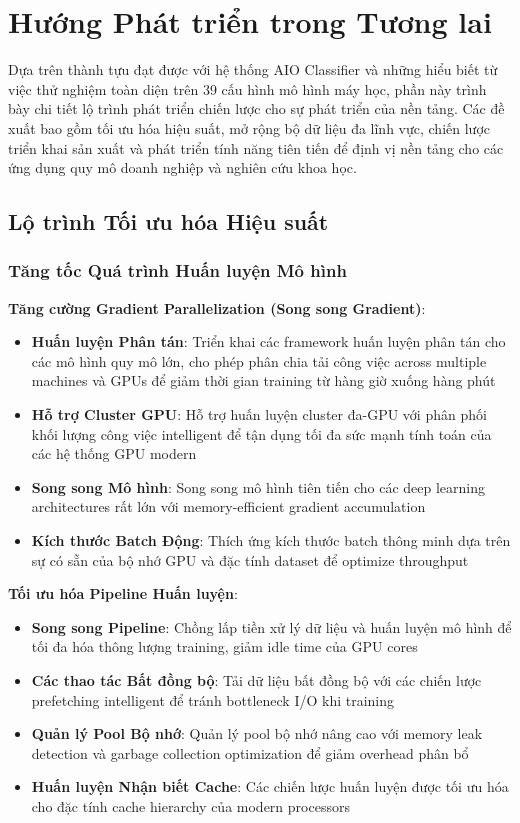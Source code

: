 \section{Hướng Phát triển trong Tương lai}\label{sec:future-development}

\noindent
Dựa trên thành tựu đạt được với hệ thống AIO Classifier và những hiểu biết từ việc thử nghiệm toàn diện trên 39 cấu hình mô hình máy học, phần này trình bày chi tiết lộ trình phát triển chiến lược cho sự phát triển của nền tảng. Các đề xuất bao gồm tối ưu hóa hiệu suất, mở rộng bộ dữ liệu đa lĩnh vực, chiến lược triển khai sản xuất và phát triển tính năng tiên tiến để định vị nền tảng cho các ứng dụng quy mô doanh nghiệp và nghiên cứu khoa học.

\subsection{Lộ trình Tối ưu hóa Hiệu suất}\label{subsec:performance-roadmap}

\subsubsection{Tăng tốc Quá trình Huấn luyện Mô hình}

\textbf{Tăng cường Gradient Parallelization (Song song Gradient)}:
\begin{itemize}
    \item \textbf{Huấn luyện Phân tán}: Triển khai các framework huấn luyện phân tán cho các mô hình quy mô lớn, cho phép phân chia tải công việc across multiple machines và GPUs để giảm thời gian training từ hàng giờ xuống hàng phút
    \item \textbf{Hỗ trợ Cluster GPU}: Hỗ trợ huấn luyện cluster đa-GPU với phân phối khối lượng công việc intelligent để tận dụng tối đa sức mạnh tính toán của các hệ thống GPU modern
    \item \textbf{Song song Mô hình}: Song song mô hình tiên tiến cho các deep learning architectures rất lớn với memory-efficient gradient accumulation
    \item \textbf{Kích thước Batch Động}: Thích ứng kích thước batch thông minh dựa trên sự có sẵn của bộ nhớ GPU và đặc tính dataset để optimize throughput
\end{itemize}

\textbf{Tối ưu hóa Pipeline Huấn luyện}:
\begin{itemize}
    \item \textbf{Song song Pipeline}: Chồng lấp tiền xử lý dữ liệu và huấn luyện mô hình để tối đa hóa thông lượng training, giảm idle time của GPU cores
    \item \textbf{Các thao tác Bất đồng bộ}: Tải dữ liệu bất đồng bộ với các chiến lược prefetching intelligent để tránh bottleneck I/O khi training
    \item \textbf{Quản lý Pool Bộ nhớ}: Quản lý pool bộ nhớ nâng cao với memory leak detection và garbage collection optimization để giảm overhead phân bổ
    \item \textbf{Huấn luyện Nhận biết Cache}: Các chiến lược huấn luyện được tối ưu hóa cho đặc tính cache hierarchy của modern processors
\end{itemize}

